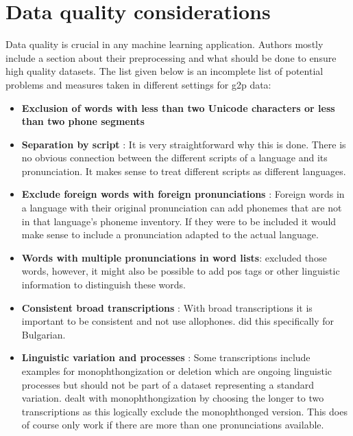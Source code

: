 \section{Data quality considerations}
\label{data_qual}
Data quality is crucial in any machine learning application. Authors mostly include a section about their preprocessing and what should be done to ensure high quality datasets. The list given below is an incomplete list of potential problems and measures taken in different settings for \ac{g2p} data:

\begin{itemize}
\item \textbf{Exclusion of words with less than two Unicode characters or less than two phone segments} \citep{Ashby&Bartley.2021} 
\item \textbf{Separation by script} \citep{Ashby&Bartley.2021}: It is very straightforward why this is done. There is no obvious connection between the different scripts of a language and its pronunciation. It makes sense to treat different scripts as different languages. 
\item \textbf{Exclude foreign words with foreign pronunciations} \citep{Ashby&Bartley.2021}: Foreign words in a language with their original pronunciation can add phonemes that are not in that language's phoneme inventory. If they were to be included it would make sense to include a pronunciation adapted to the actual language.
\item \textbf{Words with multiple pronunciations in word lists}: \cite{Ashby&Bartley.2021} excluded those words, however, it might also be possible to add \ac{pos} tags or other linguistic information to distinguish these words.
\item \textbf{Consistent broad transcriptions} \citep{Ashby&Bartley.2021}: With broad transcriptions it is important to be consistent and not use allophones. \cite{Ashby&Bartley.2021} did this specifically for Bulgarian.
\item \textbf{Linguistic variation and processes} \citep{Ashby&Bartley.2021}: Some transcriptions include examples for monophthongization or deletion which are ongoing linguistic processes but should not be part of a dataset representing a standard variation. \cite{Ashby&Bartley.2021} dealt with monophthongization by choosing the longer to two transcriptions as this logically exclude the monophthonged version. This does of course only work if there are more than one pronunciations available. 

\end{itemize}
